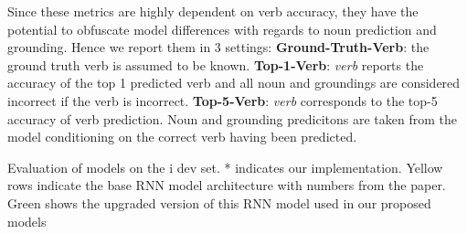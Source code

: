 \documentclass[runningheads]{llncs}
\newcommand{\dataset}{\mbox{\sc{SW}}i\mbox{\sc{G}}\xspace}
\begin{document}
Since these metrics are highly dependent on verb accuracy, they have the potential to obfuscate model differences with regards to noun prediction and grounding. Hence we report them in 3 settings: \textbf{Ground-Truth-Verb}: the ground truth verb is assumed to be known. \textbf{Top-1-Verb}: \emph{verb} reports the accuracy of the top 1 predicted verb and all noun and groundings are considered incorrect if the verb is incorrect. \textbf{Top-5-Verb}: \emph{verb} corresponds to the top-5 accuracy of verb prediction. Noun and grounding predicitons are taken from the model conditioning on the correct verb having been predicted. 




\begin{table*}
\centering
\caption{Evaluation of models on the \dataset{} dev set. * indicates our implementation. \colorbox{yellow!30}{Yellow rows} indicate the base RNN model architecture with numbers from the paper. \colorbox{green!30}{Green} shows the upgraded version of this RNN model used in our proposed models}
\vspace{-2mm}


\end{table*}
\end{document}
